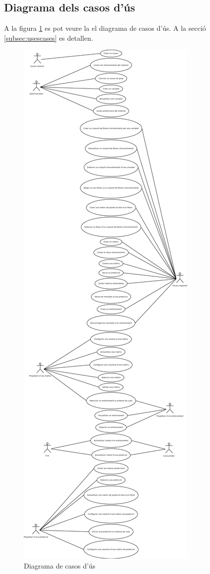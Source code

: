 \subsection{Diagrama dels casos d'\'{u}s}
A la figura \ref{fig:usecases} es pot veure la el diagrama de casos d'\'{u}s. A la secció \ref{subsec:usescases} es detallen.
\begin{figure}[h]
  \centering
  \includegraphics[scale=0.2]{img/specification/UsesCases.png}
  \caption{Diagrama de casos d'\'{u}s}
  \label{fig:usecases}
\end{figure}

